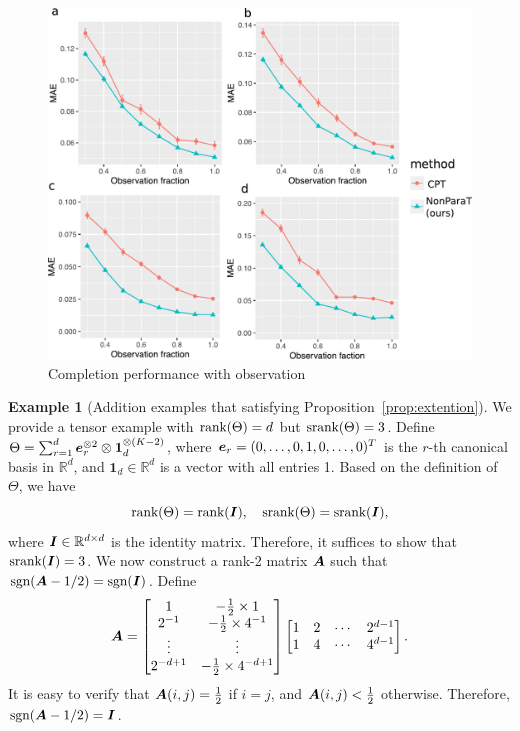 \documentclass{article}
\theoremstyle{plain}
\newtheorem{prop}{Proposition}
\theoremstyle{definition}
\newtheorem{example}{Example}
\def\sign{\textup{sgn}}
\def\srank{\textup{srank}}
\def\rank{\textup{rank}}
\begin{document}
\begin{figure}[h!]
\includegraphics[width=.5\textwidth]{figure/fig5-8.pdf}
\caption{Completion performance with observation}\label{fig:compare2}
\end{figure}

\clearpage
\begingroup
\let\clearpage\relax 
\onecolumn 
\begin{example}[Addition examples that satisfying Proposition~\ref{prop:extention}]
We provide a tensor example with $\rank(\Theta)=d$ but $\srank(\Theta)=3$. Define $\Theta=\sum_{r=1}^d \bm{e}^{\otimes 2}_r\otimes \mathbf{1}^{\otimes (K-2)}_d$, where $\bm{e}_r=(0,\ldots,0,1,0,\ldots,0)^T$ is the $r$-th canonical basis in $\mathbb{R}^d$, and $\mathbf{1}_d\in\mathbb{R}^d$ is a vector with all entries 1. Based on the definition of $\Theta$, we have
\[
\rank(\Theta)=\rank(\mI),\quad \srank(\Theta)=\srank(\mI),
\]
where $\bm I\in\mathbb{R}^{d\times d}$ is the identity matrix. Therefore, it suffices to show that $\srank(\mI)=3$. We now construct a rank-2 matrix $\bm A$ such that $\sign(\mA-1/2)=\sign(\mI)$. Define
\[
\bm A=\begin{bmatrix}
1 & -{1\over 2}\times 1\\
2^{-1}& -{1\over 2}\times 4^{-1}\\
\vdots&\vdots\\
2^{-d+1}& -{1\over 2}\times 4^{-d+1}
\end{bmatrix}
\begin{bmatrix}
1&2&\cdots&2^{d-1}\\
1&4&\cdots& 4^{d-1}
\end{bmatrix}.
\]
It is easy to verify that $\bm A(i,j)={1\over 2}$ if $i=j$, and $\bm A(i,j)<{1\over 2}$ otherwise. Therefore, $\sign(\mA-1/2)=\mI$. 
\end{example}
\end{document}
